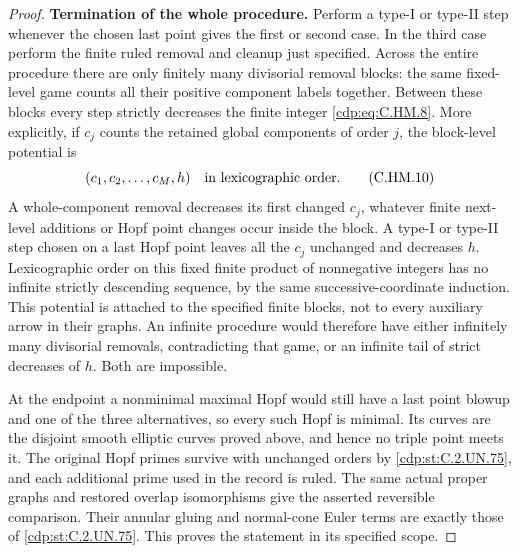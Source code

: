 \begin{proof}
\par\medskip\noindent\textbf{Termination of the whole procedure.}
Perform a type-I or type-II step whenever
the chosen last point gives the first or
second case.  In the third case perform
the finite ruled removal and cleanup
just specified.  Across the entire
procedure there are only finitely many
divisorial removal blocks: the same
fixed-level game counts all their
positive component labels together.
Between these blocks every step strictly
decreases the finite integer \eqref{cdp:eq:C.HM.8}.
More explicitly, if \(c_j\) counts the
retained global components of order \(j\),
the block-level potential is
\[
                 (c_1,c_2,\ldots,c_M,h)
                 \quad\hbox{in lexicographic order.}
\tag{C.HM.10}\label{cdp:eq:C.HM.10}
\]
A whole-component removal decreases its
first changed \(c_j\), whatever finite
next-level additions or Hopf point
changes occur inside the block.
A type-I or type-II step chosen on a
last Hopf point leaves all the \(c_j\)
unchanged and decreases \(h\).
Lexicographic order on this fixed
finite product of nonnegative integers
has no infinite strictly descending
sequence, by the same successive-coordinate
induction.  This potential is attached
to the specified finite blocks, not to
every auxiliary arrow in their graphs.
An infinite procedure would therefore
have either infinitely many divisorial
removals, contradicting that game, or
an infinite tail of strict decreases of
\(h\).  Both are impossible.

At the endpoint a nonminimal maximal
Hopf would still have a last point
blowup and one of the three alternatives,
so every such Hopf is minimal.  Its
curves are the disjoint smooth elliptic
curves proved above, and hence no
triple point meets it.  The original
Hopf primes survive with unchanged
orders by \ref{cdp:st:C.2.UN.75}, and each additional
prime used in the record is ruled.
The same actual proper graphs and
restored overlap isomorphisms give
the asserted reversible comparison.
Their annular gluing and normal-cone
Euler terms are exactly those of \ref{cdp:st:C.2.UN.75}.
This proves the statement in its
specified scope.
\end{proof}


